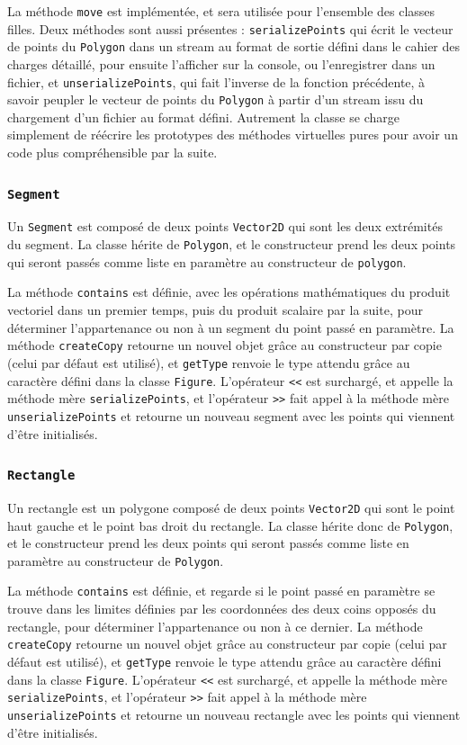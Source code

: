 \documentclass[11pt,a4paper]{article}
\begin{document}
	La méthode \texttt{move} est implémentée, et sera utilisée pour l'ensemble des classes filles. Deux méthodes sont aussi présentes : \texttt{serializePoints} qui écrit le vecteur de points du \texttt{Polygon} dans un stream au format de sortie défini dans le cahier des charges détaillé, pour ensuite l'afficher sur la console, ou l'enregistrer dans un fichier, et \texttt{unserializePoints}, qui fait l'inverse de la fonction précédente, à savoir peupler le vecteur de points du \texttt{Polygon} à partir d'un stream issu du chargement d'un fichier au format défini. Autrement la classe se charge simplement de réécrire les prototypes des méthodes virtuelles pures pour avoir un code plus compréhensible par la suite.	
	
	\subsubsection{\texttt{Segment}}
	Un \texttt{Segment} est composé de deux points \texttt{Vector2D} qui sont les deux extrémités du segment. La classe hérite de \texttt{Polygon}, et le constructeur prend les deux points qui seront passés comme liste en paramètre au constructeur de \texttt{polygon}.
	
	La méthode \texttt{contains} est définie, avec les opérations mathématiques du produit vectoriel dans un premier temps, puis du produit scalaire par la suite, pour déterminer l'appartenance ou non à un segment du point passé en paramètre. La méthode \texttt{createCopy} retourne un nouvel objet grâce au constructeur par copie (celui par défaut est utilisé), et \texttt{getType} renvoie le type attendu grâce au caractère défini dans la classe \texttt{Figure}. L'opérateur \texttt{<<} est surchargé, et appelle la méthode mère \texttt{serializePoints}, et l'opérateur \texttt{>>} fait appel à la méthode mère \texttt{unserializePoints} et retourne un nouveau segment avec les points qui viennent d'être initialisés.
	
	\subsubsection{\texttt{Rectangle}}
	Un rectangle est un polygone composé de deux points \texttt{Vector2D} qui sont le point haut gauche et le point bas droit du rectangle. La classe hérite donc de \texttt{Polygon}, et le constructeur prend les deux points qui seront passés comme liste en paramètre au constructeur de \texttt{Polygon}.
	
	La méthode \texttt{contains} est définie, et regarde si le point passé en paramètre se trouve dans les limites définies par les coordonnées des deux coins opposés du rectangle, pour déterminer l'appartenance ou non à ce dernier. La méthode \texttt{createCopy} retourne un nouvel objet grâce au constructeur par copie (celui par défaut est utilisé), et \texttt{getType} renvoie le type attendu grâce au caractère défini dans la classe \texttt{Figure}. L'opérateur \texttt{<<} est surchargé, et appelle la méthode mère \texttt{serializePoints}, et l'opérateur \texttt{>>} fait appel à la méthode mère \texttt{unserializePoints} et retourne un nouveau rectangle avec les points qui viennent d'être initialisés.
	
\end{document}
